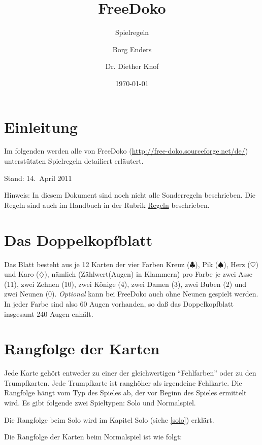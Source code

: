 \documentclass{scrartcl}
\newcommand{\kreuz}{$\clubsuit$\xspace}
\newcommand{\pik}{$\spadesuit$\xspace}
\newcommand{\herz}{$\heartsuit$\xspace}
\newcommand{\karo}{$\diamondsuit$\xspace}
\newcommand{\Optional}{\textit{Optional}\xspace}
\begin{document}
\title{FreeDoko}
\subtitle{Spielregeln}
\author{Borg Enders \and Dr. Diether Knof}
\date{\today}

\maketitle

\tableofcontents

\section{Einleitung}

Im folgenden werden alle von FreeDoko (\href{http://free-doko.sourceforge.net/de/}{http://free-doko.sourceforge.net/de/}) unterstützten Spielregeln
detailiert erläutert.

Stand: 14.~April 2011

Hinweis: In diesem Dokument sind noch nicht alle Sonderregeln beschrieben.
Die Regeln sind auch im Handbuch in der Rubrik \href{http://free-doko.sourceforge.net/doc/manual/de/operation/rules_config.html}{Regeln} beschrieben.


\section{Das Doppelkopfblatt}
Das Blatt besteht aus je 12 Karten der vier Farben Kreuz
(\kreuz), Pik (\pik), Herz (\herz) und Karo (\karo), nämlich
(Zählwert(Augen) in Klammern) pro Farbe je zwei Asse (11), zwei
Zehnen (10), zwei Könige (4), zwei Damen (3), zwei Buben (2) und
zwei Neunen (0). \Optional kann bei FreeDoko auch ohne Neunen
gespielt werden. In jeder Farbe sind also 60 Augen vorhanden, so
daß das Doppelkopfblatt insgesamt 240 Augen enhält.

\section{Rangfolge der Karten}

Jede Karte gehört entweder zu einer der gleichwertigen "`Fehlfarben"' oder zu den Trumpfkarten. Jede Trumpfkarte ist ranghöher als irgendeine Fehlkarte. Die Rangfolge hängt vom Typ des Spieles ab, der vor Beginn des Spieles ermittelt wird. Es gibt folgende zwei Spieltypen: Solo und Normalspiel.

Die Rangfolge beim Solo wird im Kapitel Solo (siehe \ref{solo}) erklärt.

Die Rangfolge der Karten beim Normalspiel ist wie folgt:
\end{document}
